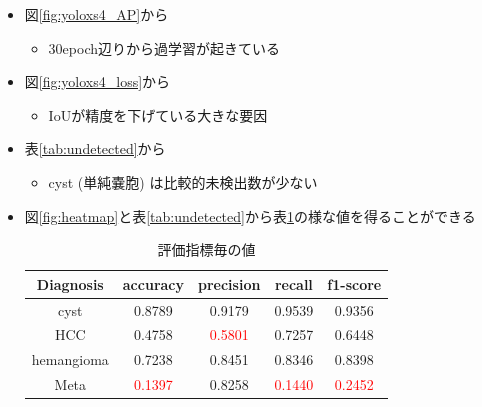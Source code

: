 \documentclass[a4j]{ujarticle}
\newcommand{\Tref}[1]{\mbox{表\ref{tab:#1}}}
\newcommand{\Fref}[1]{\mbox{図\ref{fig:#1}}}
\begin{document}
\begin{itemize}
            \begin{itemize}
                \item \Fref{yoloxs4_AP}から
                \begin{itemize}
                    \item 30epoch辺りから過学習が起きている
                \end{itemize}
                \item \Fref{yoloxs4_loss}から
                \begin{itemize}
                    \item IoUが精度を下げている大きな要因
                \end{itemize}
                \item \Tref{undetected}から
                \begin{itemize}
                    \item cyst (単純嚢胞) は比較的未検出数が少ない
                \end{itemize}
                \item \Fref{heatmap}と\Tref{undetected}から\Tref{heatmap}の様な値を得ることができる

                \begin{table}[h]
                    \centering
                    \caption{評価指標毎の値}
                    \label{tab:heatmap}
                    \begin{tabular}{c|cccc}
                        Diagnosis & accuracy & precision & recall & f1-score \\ \hline
                        cyst & 0.8789 & 0.9179 & 0.9539 & 0.9356 \\
                        HCC & 0.4758 & \textcolor{red}{0.5801} & 0.7257 & 0.6448 \\
                        hemangioma & 0.7238 & 0.8451 & 0.8346 & 0.8398 \\
                        Meta & \textcolor{red}{0.1397} & 0.8258 & \textcolor{red}{0.1440} & \textcolor{red}{0.2452} \\
                    \end{tabular}
                \end{table}


\end{itemize}
\end{itemize}
\end{document}
